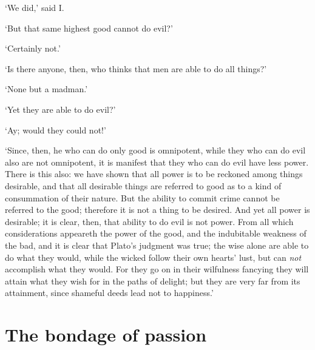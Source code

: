 \documentclass[11pt]{book}
\begin{document}
`We did,' said I.

`But that same highest good cannot do evil?'

`Certainly not.'

`Is there anyone, then, who thinks that men are able to do all things?'

`None but a madman.'

`Yet they are able to do evil?'

`Ay; would they could not!'

`Since, then, he who can do only good is omnipotent, while they who can
do evil also are not omnipotent, it is manifest that they who can do
evil have less power. There is this also: we have shown that all power
is to be reckoned among things desirable, and that all desirable things
are referred to good as to a kind of consummation of their nature. But
the ability to commit crime cannot be referred to the good; therefore it
is not a thing to be desired. And yet all power is desirable; it is
clear, then, that ability to do evil is not power. From all which
considerations appeareth the power of the good, and the indubitable
weakness of the bad, and it is clear that Plato's judgment was true; the
wise alone are able to do what they would, while the wicked follow their
own hearts' lust, but can \emph{not} accomplish what they would. For they go
on in their wilfulness fancying they will attain what they wish for in
the paths of delight; but they are very far from its attainment, since
shameful deeds lead not to happiness.'



\section{The bondage of passion}
\end{document}
